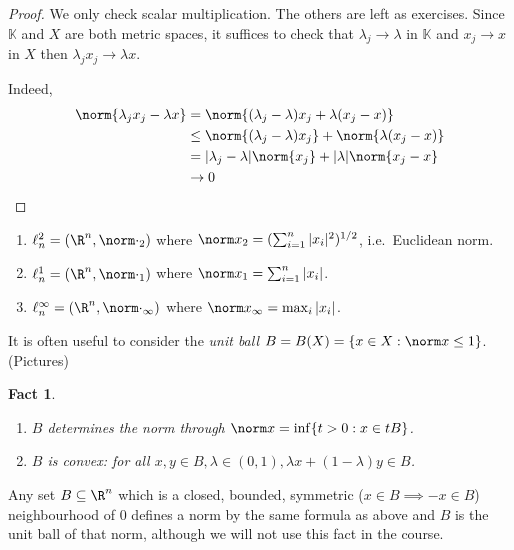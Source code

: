 \documentclass[a4paper]{article}
\newtheorem*{fact}{Fact}
\newcommand{\K}{{\mathbb{K}}} %
\begin{document}
\begin{proof}
  We only check scalar multiplication. The others are left as exercises. Since \(\K\) and \(X\) are both metric spaces, it suffices to check that \(\lambda_j \to \lambda\) in \(\K\) and \(x_j \to x\) in \(X\) then \(\lambda_j x_j \to \lambda x\).

  Indeed,
  \begin{align*}
    \norm{\lambda_j x_j - \lambda x}
    &= \norm{(\lambda_j - \lambda) x_j + \lambda(x_j - x)} \\
    &\leq \norm{(\lambda_j - \lambda) x_j} + \norm{\lambda(x_j - x)} \\
    &= |\lambda_j - \lambda| \norm{x_j} +|\lambda| \norm{x_j - x} \\
    &\to 0
  \end{align*}
\end{proof}

\begin{eg}\leavevmode
  \begin{enumerate}
  \item \(\ell_n^2 = (\R^n, \norm \cdot_2)\) where \(\norm x_2 = (\sum_{i = 1}^n |x_i|^2)^{1/2}\), i.e.\ Euclidean norm.
  \item \(\ell_n^1 = (\R^n, \norm \cdot_1)\) where \(\norm x_1 = \sum_{i = 1}^n |x_i|\).
  \item \(\ell_n^\infty = (\R^n, \norm \cdot_\infty)\) where \(\norm x_\infty = \max_i |x_i|\).
  \end{enumerate}
\end{eg}

It is often useful to consider the \emph{unit ball} \(B = B(X) = \{x \in X: \norm x \leq 1\}\). (Pictures)

\begin{fact}\leavevmode
\begin{enumerate}
\item \(B\) determines the norm through \(\norm x = \inf \{t > 0: x \in tB\}\).
\item \(B\) is \emph{convex}: for all \(x, y \in B, \lambda \in (0, 1), \lambda x + (1 - \lambda) y \in B\).
\end{enumerate}
\end{fact}

\begin{remark}
  Any set \(B \subseteq \R^n\) which is a closed, bounded, symmetric (\(x \in B \implies -x \in B\)) neighbourhood of \(0\) defines a norm by the same formula as above and \(B\) is the unit ball of that norm, although we will not use this fact in the course.
\end{remark}
\end{document}
